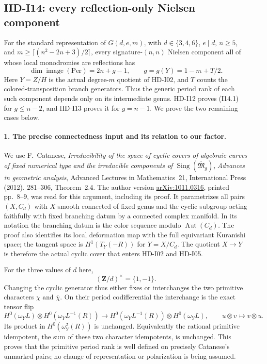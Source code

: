 \subsection{HD-I14: every reflection-only Nielsen component}
\label{sec:HD-I14}

For the standard representation of $G(d,e,m)$, with
$d\in\{3,4,6\}$, $e\mid d$, $n\geq5$, and
$m\geq\lceil(n^2-2n+3)/2\rceil$, every signature-$(n,n)$ Nielsen
component all of whose local monodromies are reflections has
\begin{equation}
 \boxed{\quad
 \dim\operatorname{image}(\mathrm{Per})=2n+g-1,
 \qquad g=g(Y)=1-m+T/2.
 \quad}                                             \tag{I14.1}
\end{equation}
Here $Y=Z/H$ is the actual degree-$m$ quotient of HD-I02, and $T$ counts
the colored-transposition branch generators.  Thus the generic period
rank of each such component depends only on its intermediate genus.
HD-I12 proves (I14.1) for $g\leq n-2$, and HD-I13 proves it for $g=n-1$.
We prove the two remaining cases below.

\paragraph{1. The precise connectedness input and its relation to our factor.}
We use F.~Catanese, \emph{Irreducibility of the space of cyclic covers
of algebraic curves of fixed numerical type and the irreducible
components of $\operatorname{Sing}(\overline{\mathfrak M}_g)$},
\emph{Advances in geometric analysis}, Advanced Lectures in
Mathematics~21, International Press (2012), 281--306, Theorem~2.4.
The author version \href{https://arxiv.org/pdf/1011.0316}{arXiv:1011.0316},
printed pp.~8--9, was read for this argument, including its proof.
It parametrizes all pairs $(X,C_d)$ with $X$ smooth connected of fixed
genus and the cyclic subgroup acting faithfully with fixed branching
datum by a connected complex manifold.  In its notation the branching
datum is the color sequence modulo $\operatorname{Aut}(C_d)$.
The proof also identifies its local deformation map with the full
equivariant Kuranishi space; the tangent space is
$H^1(T_Y(-R))$ for $Y=X/C_d$.  The quotient $X\to Y$ is therefore the
actual cyclic cover that enters HD-I02 and HD-I05.

For the three values of $d$ here,
\[
              (\mathbf Z/d)^\times=\{1,-1\}.
\]
Changing the cyclic generator thus either fixes or interchanges the
two primitive characters $\chi$ and $\bar\chi$.  On their period
codifferential the interchange is the exact tensor flip
\[
 H^0(\omega_Y L)\otimes H^0(\omega_Y L^{-1}(R))
 \longrightarrow
 H^0(\omega_Y L^{-1}(R))\otimes H^0(\omega_Y L),
 \qquad u\otimes v\longmapsto v\otimes u.
\]
Its product in $H^0(\omega_Y^2(R))$ is unchanged.  Equivalently the
rational primitive idempotent, the sum of these two character
idempotents, is unchanged.  This proves that the primitive period rank
is well defined on precisely Catanese's unmarked pairs; no change of
representation or polarization is being assumed.


